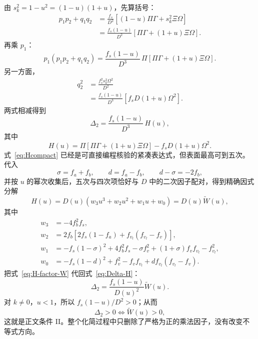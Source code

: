 \documentclass[11pt,a4paper,openany]{book}
\numberwithin{equation}{chapter}
\numberwithin{figure}{chapter}
\numberwithin{table}{chapter}
\begin{document}
由 $s_k^2=1-u^2=(1-u)(1+u)$，先算括号：
\begin{align}
p_1p_2+q_1q_2
&=\frac{f_s}{D^2}\left[(1-u)\Pi\Gamma+s_k^2\Xi\Omega\right]\\
&=\frac{f_s(1-u)}{D^2}
\left[\Pi\Gamma+(1+u)\Xi\Omega\right].
\end{align}
再乘 $p_1$：
\begin{equation}
p_1(p_1p_2+q_1q_2)
=\frac{f_s(1-u)}{D^3}\,
\Pi\left[\Pi\Gamma+(1+u)\Xi\Omega\right].
\end{equation}
另一方面，
\begin{align}
q_2^2
&=\frac{f_s^2s_k^2\Omega^2}{D^2}\\
&=\frac{f_s(1-u)}{D^3}
\left[f_sD(1+u)\Omega^2\right].
\end{align}
两式相减得到
\begin{equation}
\Delta_2
=\frac{f_s(1-u)}{D^3}\,H(u),
\label{eq:Delta-H}
\end{equation}
其中
\begin{equation}
H(u)=
\Pi\left[\Pi\Gamma+(1+u)\Xi\Omega\right]
-f_sD(1+u)\Omega^2.
\label{eq:Hcompact}
\end{equation}
式~\eqref{eq:Hcompact} 已经是可直接编程核验的紧凑表达式，但表面最高可到五次。代入
\begin{equation}
\sigma=f_a+f_b,
\qquad
d=f_a-f_b,
\qquad
d-\sigma=-2f_b,
\end{equation}
并按 $u$ 的幂次收集后，五次与四次项恰好与 $D$ 中的二次因子配对，得到精确因式分解
\begin{equation}
H(u)=D(u)\left(w_3u^3+w_2u^2+w_1u+w_0\right)
=D(u)\widetilde W(u),
\label{eq:H-factor-W}
\end{equation}
其中
\begin{align}
w_3&=-4f_b^2f_s,\\
w_2&=2f_b\left[2f_s(1-f_a)+f_{v_l}(f_{v_l}-f_v)\right],\\
w_1&=-f_s(1-\sigma)^2+4f_b^2f_s-\sigma f_v^2
+(1+\sigma)f_vf_{v_l}-f_{v_l}^2,\\
w_0&=-f_s(1-d)^2+f_v^2-f_vf_{v_l}
+d f_{v_l}(f_{v_l}-f_v).
\label{eq:Wcoeff-full-appendix}
\end{align}
把式~\eqref{eq:H-factor-W} 代回式~\eqref{eq:Delta-H}：
\begin{equation}
\boxed{
\Delta_2
=\frac{f_s(1-u)}{D(u)^2}\widetilde W(u)
}.
\label{eq:Delta-final-appendix}
\end{equation}
对 $k\ne0$，$u<1$，所以 $f_s(1-u)/D^2>0$；从而
\begin{equation}
\Delta_2>0\iff\widetilde W(u)>0,
\end{equation}
这就是正文条件 II。整个化简过程中只删除了严格为正的乘法因子，没有改变不等式方向。
\end{document}
